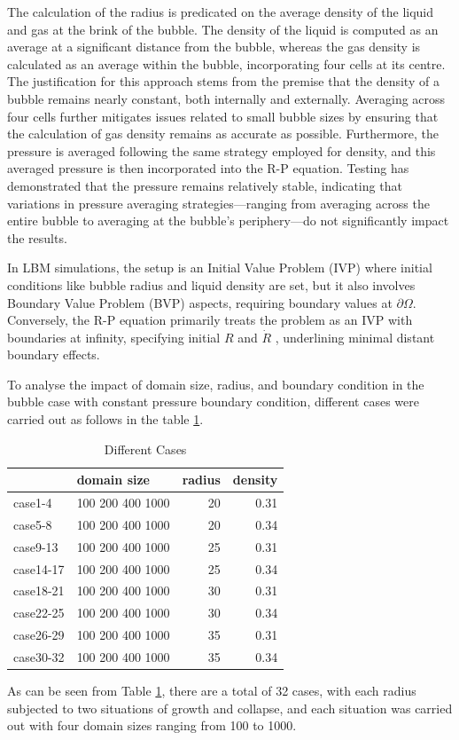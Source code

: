 \documentclass[review]{elsarticle}
\begin{document}
The calculation of the radius is predicated on the average density of the liquid and gas at the brink of the bubble. The density of the liquid is computed as an average at a significant distance from the bubble, whereas the gas density is calculated as an average within the bubble, incorporating four cells at its centre. The justification for this approach stems from the premise that the density of a bubble remains nearly constant, both internally and externally. Averaging across four cells further mitigates issues related to small bubble sizes by ensuring that the calculation of gas density remains as accurate as possible. Furthermore, the pressure is averaged following the same strategy employed for density, and this averaged pressure is then incorporated into the R-P equation. Testing has demonstrated that the pressure remains relatively stable, indicating that variations in pressure averaging strategies—ranging from averaging across the entire bubble to averaging at the bubble's periphery—do not significantly impact the results.

In LBM simulations, the setup is an Initial Value Problem (IVP) where initial conditions like bubble radius and liquid density are set, but it also involves Boundary Value Problem (BVP) aspects, requiring boundary values at $\partial \Omega$. Conversely, the R-P equation primarily treats the problem as an IVP with boundaries at infinity, specifying initial $R$ and  $\dot{R}$ , underlining minimal distant boundary effects.

To analyse the impact of domain size, radius, and boundary condition in the bubble case with constant pressure boundary condition, different cases were carried out as follows in the table \ref{tab:cases}.
\begin{table}[htbp]
	\centering
	\caption{Different Cases}
	\begin{tabular}{llrr}
		\toprule
		\toprule
		& domain size & \multicolumn{1}{l}{radius} & \multicolumn{1}{l}{density} \\
		\midrule
		case1-4 & 100 200 400 1000 & 20    & 0.31 \\
		\midrule
		case5-8 & 100 200 400 1000 & 20    & 0.34 \\
		\midrule
		case9-13 & 100 200 400 1000 & 25    & 0.31 \\
		\midrule
		case14-17 & 100 200 400 1000 & 25    & 0.34 \\
		\midrule
		case18-21 & 100 200 400 1000 & 30    & 0.31 \\
		\midrule
		case22-25 & 100 200 400 1000 & 30    & 0.34 \\
		\midrule
		case26-29 & 100 200 400 1000 & 35    & 0.31 \\
		\midrule
		case30-32 & 100 200 400 1000 & 35    & 0.34 \\
		\bottomrule
		\bottomrule
	\end{tabular}%
	\label{tab:cases}%
\end{table}%
As can be seen from Table \ref{tab:cases}, there are a total of 32 cases, with each radius subjected to two situations of growth and collapse, and each situation was carried out with four domain sizes ranging from 100 to 1000.   
\end{document}
